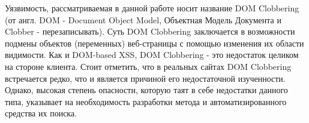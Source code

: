 Уязвимость, рассматриваемая в данной работе носит название DOM Clobbering (от англ. DOM - Document Object Model, Объектная Модель Документа и Clobber - перезаписывать). Суть DOM Clobbering заключается в возможности подмены объектов (переменных) веб-страницы с помощью изменения их области видимости. Как и DOM-based XSS, DOM Clobbering - это недостаток целиком на стороне клиента. Стоит отметить, что в реальных сайтах DOM Clobbering встречается редко, что и является причиной его недостаточной изученности. Однако, высокая степень опасности, которую таят в себе недостатки данного типа, указывает на необходимость разработки метода и автоматизированного средства их поиска.